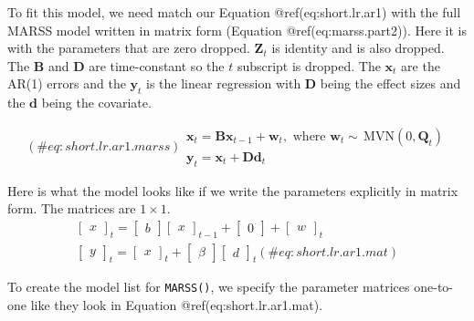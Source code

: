 \documentclass[12pt,]{book}
\begin{document}
To fit this model, we need match our Equation @ref(eq:short.lr.ar1) with the full MARSS model written in matrix form (Equation @ref(eq:marss.part2)). Here it is with the parameters that are zero dropped. \(\mathbf{Z}_t\) is identity and is also dropped. The \(\mathbf{B}\) and \(\mathbf{D}\) are time-constant so the \(t\) subscript is dropped. The \(\mathbf{x}_t\) are the AR(1) errors and the \(\mathbf{y}_t\) is the linear regression with \(\mathbf{D}\) being the effect sizes and the \(\mathbf{d}\) being the covariate.

\begin{equation}(\#eq:short.lr.ar1.marss)
\begin{gather}
\mathbf{x}_t = \mathbf{B}\mathbf{x}_{t-1} + \mathbf{w}_t, \text{ where } \mathbf{w}_t \sim \,\text{MVN}(0,\mathbf{Q}_t)\\
\mathbf{y}_t = \mathbf{x}_t + \mathbf{D}\mathbf{d}_t
\end{gather}
\end{equation}

Here is what the model looks like if we write the parameters explicitly in matrix form. The matrices are \(1 \times 1\).
\begin{gather}
\begin{bmatrix}x\end{bmatrix}_{t} = \begin{bmatrix}b\end{bmatrix}\begin{bmatrix}x\end{bmatrix}_{t-1} + \begin{bmatrix}0\end{bmatrix} + \begin{bmatrix}w\end{bmatrix}_{t}  \\
\begin{bmatrix}y\end{bmatrix}_{t} = \begin{bmatrix}x\end{bmatrix}_{t} + \begin{bmatrix}\beta\end{bmatrix}\begin{bmatrix}d\end{bmatrix}_t
(\#eq:short.lr.ar1.mat)
\end{gather}

To create the model list for \texttt{MARSS()}, we specify the parameter matrices one-to-one like they look in Equation @ref(eq:short.lr.ar1.mat).
\end{document}
